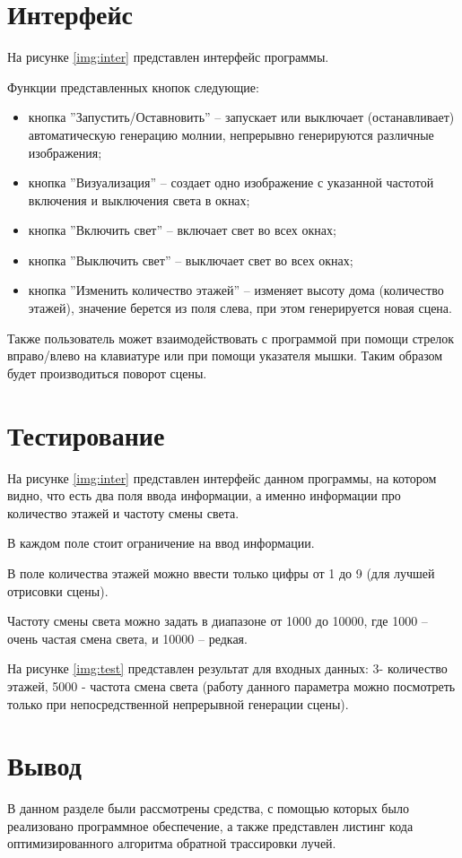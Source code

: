 \section{Интерфейс}
На рисунке \ref{img:inter} представлен интерфейс программы.


Функции представленных кнопок следующие:
\begin{itemize}
	\item кнопка ''Запустить/Оставновить'' -- запускает или выключает (останавливает) автоматическую генерацию молнии, непрерывно генерируются различные изображения;
	\item кнопка ''Визуализация'' -- создает одно изображение с указанной частотой включения и выключения света в окнах;
	\item кнопка ''Включить свет'' -- включает свет во всех окнах;
	\item кнопка ''Выключить свет'' -- выключает свет во всех окнах;
	\item кнопка ''Изменить количество этажей'' -- изменяет высоту дома (количество этажей), значение берется из поля слева, при этом генерируется новая сцена.
\end{itemize}

Также пользователь может взаимодействовать с программой при помощи стрелок вправо/влево на клавиатуре или при помощи указателя мышки. Таким образом будет производиться поворот сцены.

\section{Тестирование}

На рисунке \ref{img:inter} представлен интерфейс данном программы, на котором видно, что есть два поля ввода информации, а именно информации про количество этажей и частоту смены света. 

В каждом поле стоит ограничение на ввод информации.

В поле количества этажей можно ввести только цифры от 1 до 9 (для лучшей отрисовки сцены).

Частоту смены света можно задать в диапазоне от 1000 до 10000, где 1000 -- очень частая смена света, и 10000 -- редкая.

На рисунке \ref{img:test} представлен результат для входных данных: 3- количество этажей, 5000 - частота смена света (работу данного параметра можно посмотреть только при непосредственной непрерывной генерации сцены).



\section{Вывод}
В данном разделе были рассмотрены средства, с помощью которых было реализовано программное обеспечение, а также представлен листинг кода оптимизированного алгоритма обратной трассировки лучей.